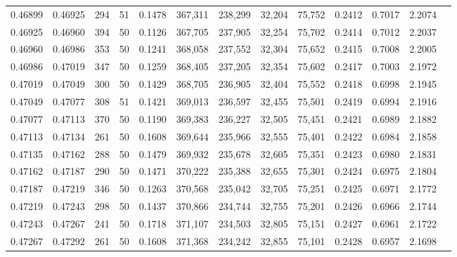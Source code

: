 \begin{tabular}{rrrrrrrrrrrrr}
0.46899 & 0.46925 &   294 &  51 &                                     0.1478 & 367,311 & 238,299 &  32,204 &  75,752 & 0.2412 & 0.7017 & 2.2074 \\
0.46925 & 0.46960 &   394 &  50 &                                     0.1126 & 367,705 & 237,905 &  32,254 &  75,702 & 0.2414 & 0.7012 & 2.2037 \\
0.46960 & 0.46986 &   353 &  50 &                                     0.1241 & 368,058 & 237,552 &  32,304 &  75,652 & 0.2415 & 0.7008 & 2.2005 \\
0.46986 & 0.47019 &   347 &  50 &                                     0.1259 & 368,405 & 237,205 &  32,354 &  75,602 & 0.2417 & 0.7003 & 2.1972 \\
0.47019 & 0.47049 &   300 &  50 &                                     0.1429 & 368,705 & 236,905 &  32,404 &  75,552 & 0.2418 & 0.6998 & 2.1945 \\
0.47049 & 0.47077 &   308 &  51 &                                     0.1421 & 369,013 & 236,597 &  32,455 &  75,501 & 0.2419 & 0.6994 & 2.1916 \\
0.47077 & 0.47113 &   370 &  50 &                                     0.1190 & 369,383 & 236,227 &  32,505 &  75,451 & 0.2421 & 0.6989 & 2.1882 \\
0.47113 & 0.47134 &   261 &  50 &                                     0.1608 & 369,644 & 235,966 &  32,555 &  75,401 & 0.2422 & 0.6984 & 2.1858 \\
0.47135 & 0.47162 &   288 &  50 &                                     0.1479 & 369,932 & 235,678 &  32,605 &  75,351 & 0.2423 & 0.6980 & 2.1831 \\
0.47162 & 0.47187 &   290 &  50 &                                     0.1471 & 370,222 & 235,388 &  32,655 &  75,301 & 0.2424 & 0.6975 & 2.1804 \\
0.47187 & 0.47219 &   346 &  50 &                                     0.1263 & 370,568 & 235,042 &  32,705 &  75,251 & 0.2425 & 0.6971 & 2.1772 \\
0.47219 & 0.47243 &   298 &  50 &                                     0.1437 & 370,866 & 234,744 &  32,755 &  75,201 & 0.2426 & 0.6966 & 2.1744 \\
0.47243 & 0.47267 &   241 &  50 &                                     0.1718 & 371,107 & 234,503 &  32,805 &  75,151 & 0.2427 & 0.6961 & 2.1722 \\
0.47267 & 0.47292 &   261 &  50 &                                     0.1608 & 371,368 & 234,242 &  32,855 &  75,101 & 0.2428 & 0.6957 & 2.1698 \\

\end{tabular}

